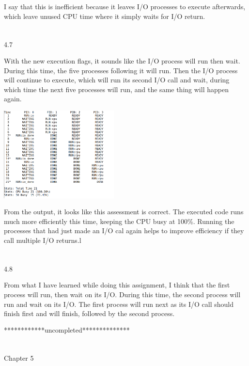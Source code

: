 \documentclass[12pt, a4paper]{article}
\begin{document}
	I say that this is inefficient because it leaves I/O processes to execute afterwards, which leave unused CPU time where it simply waits for I/O return. \\ \\ \\

4.7
	
	With the new execution flags, it sounds like the I/O process will run then wait. During this time, the five processes following it will run. Then the I/O process will continue to execute, which will run its second I/O call and wait, during which time the next five processes will run, and the same thing will happen again.
	
	\begin{center}
	\includegraphics[width=6cm]{hw1_4_7.png}\\
	\end{center}
	
	From the output, it looks like this assessment is correct. The executed code runs much more efficiently this time, keeping the CPU busy at 100\%. Running the processes that had just made an I/O cal again helps to improve efficiency if they call multiple I/O returns.l \\ \\ \\

4.8

	From what I have learned while doing this assignment, I think that the first process will run, then wait on its I/O. During this time, the second process will run and wait on its I/O. The first process will run next as its I/O call should finish first and will finish, followed by the second process.
	
	************uncompleted**************	 \\ \\ \\
	



\noindent
Chapter 5\\
\end{document}
